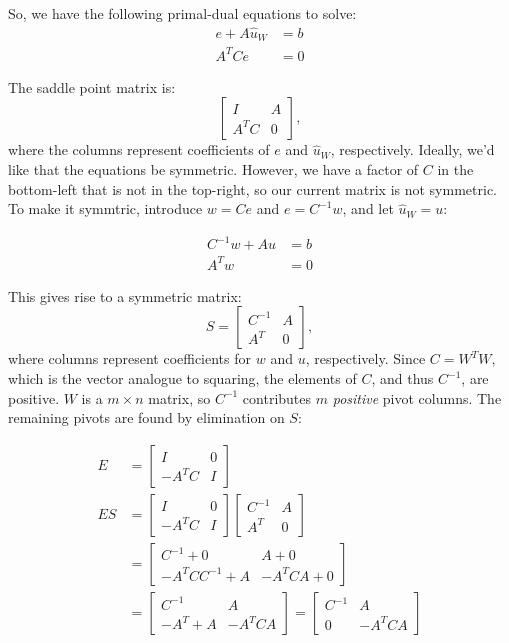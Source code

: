 \documentclass[]{article}
\begin{document}
So, we have the following primal-dual equations to solve:
\begin{align}
e + A \hat{u}_W &= b \\ 
A^T C e &= 0 
\end{align}

The saddle point matrix is: \begin{equation}
\begin{bmatrix}
	I & A \\
	A^T C & 0
\end{bmatrix}, 
\end{equation} where the columns represent coefficients of $e$ and $\hat{u}_W$, respectively. Ideally, we'd like that the equations be symmetric. However, we have a factor of $C$ in the bottom-left that is not in the top-right, so our current matrix is not symmetric. To make it symmtric, introduce $w = Ce$ and $e = C^{-1}w$, and let $\hat{u}_W = u$:

\begin{align}
C^{-1}w + Au &= b \label{wlsq1} \\
A^T w &= 0 \label{wlsq2}
\end{align}

This gives rise to a symmetric matrix: \begin{equation}
S = \begin{bmatrix}
	C^{-1} & A \\ A^T & 0
\end{bmatrix},
\end{equation} where columns represent coefficients for $w$ and $u$, respectively. Since $C = W^T W$, which is the vector analogue to squaring, the elements of $C$, and thus $C^{-1}$, are positive. $W$ is a $m \times n$ matrix, so $C^{-1}$ contributes $m$ \textit{positive} pivot columns. The remaining pivots are found by elimination on $S$:

\begin{align}
E &= \begin{bmatrix} I & 0 \\ -A^T C & I  \end{bmatrix} \\
ES &= \begin{bmatrix} I & 0 \\ -A^T C & I  \end{bmatrix} \begin{bmatrix} C^{-1} & A \\ A^T & 0 \end{bmatrix} \\
	&= \begin{bmatrix} C^{-1} + 0 & A + 0 \\ -A^T C C^{-1} + A & -A^T C A + 0 \end{bmatrix} \\
	&= \begin{bmatrix} C^{-1} & A \\ -A^T + A & -A^T C A \end{bmatrix} = \begin{bmatrix} C^{-1} & A \\ 0 & -A^T C A \end{bmatrix}
\end{align}
\end{document}
